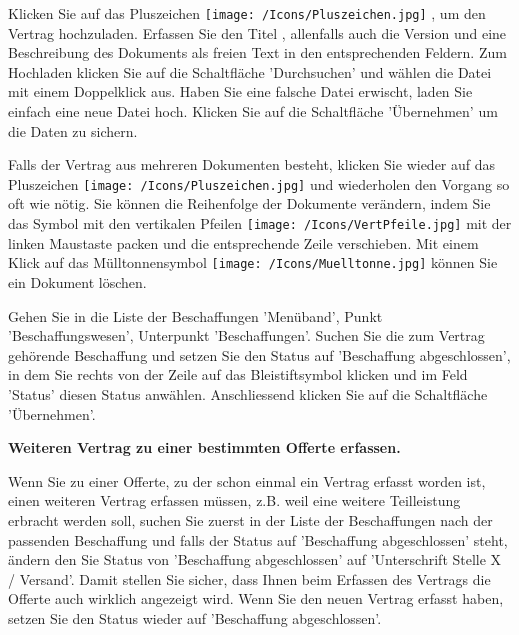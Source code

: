 Klicken Sie auf das Pluszeichen \texttt{[image: /Icons/Pluszeichen.jpg]} , um den Vertrag hochzuladen. Erfassen Sie den Titel , allenfalls auch die Version  und eine Beschreibung des Dokuments  als freien Text in den entsprechenden Feldern. Zum Hochladen klicken Sie auf die Schaltfläche 'Durchsuchen'  und wählen die Datei mit einem Doppelklick aus. Haben Sie eine falsche Datei erwischt, laden Sie einfach eine neue Datei hoch. Klicken Sie auf die Schaltfläche 'Übernehmen'  um die Daten zu sichern.

\vspace{\baselineskip}

Falls der Vertrag aus mehreren Dokumenten besteht, klicken Sie wieder auf das Pluszeichen \texttt{[image: /Icons/Pluszeichen.jpg]}  und wiederholen den Vorgang so oft wie nötig. Sie können die Reihenfolge der Dokumente verändern, indem Sie das Symbol mit den vertikalen Pfeilen \texttt{[image: /Icons/VertPfeile.jpg]}  mit der linken\textcolor{red}{ }Maustaste packen und die entsprechende Zeile verschieben. Mit einem Klick auf das Mülltonnensymbol \texttt{[image: /Icons/Muelltonne.jpg]}  können Sie ein Dokument löschen.

\vspace{\baselineskip}

Gehen Sie in die Liste der Beschaffungen 'Menüband', Punkt 'Beschaffungswesen', Unterpunkt 'Beschaffungen'. Suchen Sie die zum Vertrag gehörende Beschaffung und setzen Sie den Status auf 'Beschaffung abgeschlossen', in dem Sie rechts von der Zeile auf das Bleistiftsymbol klicken und im Feld 'Status' diesen Status anwählen. Anschliessend klicken Sie auf die Schaltfläche 'Übernehmen'.

\vspace{\baselineskip}

\textbf{Weiteren Vertrag zu einer bestimmten Offerte erfassen.}

Wenn Sie zu einer Offerte, zu der schon einmal ein Vertrag erfasst worden ist, einen weiteren Vertrag erfassen müssen, z.B. weil eine weitere Teilleistung erbracht werden soll, suchen Sie zuerst in der Liste der Beschaffungen nach der passenden Beschaffung und falls der Status auf 'Beschaffung abgeschlossen' steht, ändern den Sie Status von 'Beschaffung abgeschlossen' auf 'Unterschrift Stelle X / Versand'. Damit stellen Sie sicher, dass Ihnen beim Erfassen des Vertrags die Offerte auch wirklich angezeigt wird. Wenn Sie den neuen Vertrag erfasst haben, setzen Sie den Status wieder auf 'Beschaffung abgeschlossen'.

